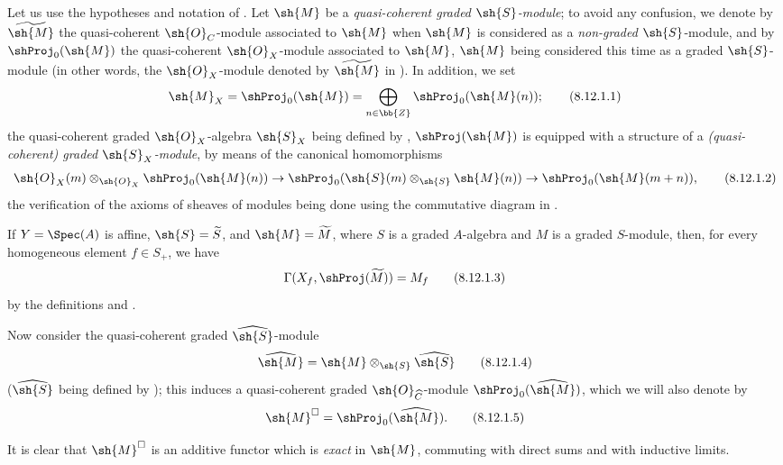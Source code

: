 \begin{env}[8.12.1]
\label{II.8.12.1}
Let us use the hypotheses and notation of .
Let $\sh{M}$ be a \emph{quasi-coherent graded $\sh{S}$-module}; to avoid any confusion, we denote by $\widetilde{\sh{M}}$ the quasi-coherent $\sh{O}_C$-module
associated to $\sh{M}$  when $\sh{M}$ is considered as a \emph{non-graded} $\sh{S}$-module, and by $\shProj_0(\sh{M})$ the quasi-coherent $\sh{O}_X$-module associated to $\sh{M}$, $\sh{M}$ being considered this time as a graded $\sh{S}$-module (in other words, the $\sh{O}_X$-module denoted by $\widetilde{\sh{M}}$ in ).
In addition, we set
\[
\label{II.8.12.1.1}
  \sh{M}_X=\shProj_0(\sh{M})=\bigoplus_{n\in\bb{Z}}\shProj_0(\sh{M}(n));
\tag{8.12.1.1}
\]
the quasi-coherent graded $\sh{O}_X$-algebra $\sh{S}_X$ being defined by , $\shProj(\sh{M})$ is equipped with a structure of a \emph{(quasi-coherent) graded $\sh{S}_X$-module}, by means of the canonical homomorphisms 
\[
\label{II.8.12.1.2}
  \sh{O}_X(m)\otimes_{\sh{O}_X}\shProj_0(\sh{M}(n))\to\shProj_0(\sh{S}(m)\otimes_\sh{S}\sh{M}(n))\to\shProj_0(\sh{M}(m+n)),
\tag{8.12.1.2}
\]
the verification of the axioms of sheaves of modules being done using the commutative diagram in .

If $Y=\Spec(A)$ is affine, $\sh{S}=\widetilde{S}$, and $\sh{M}=\widetilde{M}$, where $S$ is a graded $A$-algebra and $M$ is a graded $S$-module, then, for every homogeneous element $f\in S_+$, we have
\[
\label{II.8.12.1.3}
  \Gamma(X_f,\shProj(\widetilde{M}))=M_f
\tag{8.12.1.3}
\]
by the definitions and .

Now consider the quasi-coherent graded $\widehat{\sh{S}}$-module
\[
\label{II.8.12.1.4}
  \widehat{\sh{M}}=\sh{M}\otimes_\sh{S}\widehat{\sh{S}}
\tag{8.12.1.4}
\]
($\widehat{\sh{S}}$ being defined by ); this induces a quasi-coherent graded $\sh{O}_{\widehat{C}}$-module $\shProj_0(\widehat{\sh{M}})$, which we will also denote by
\[
\label{II.8.12.1.5}
  \sh{M}^\square=\shProj_0(\widehat{\sh{M}}).
\tag{8.12.1.5}
\]

It is clear  that $\sh{M}^\square$ is an additive functor which is \emph{exact} in $\sh{M}$, commuting with direct sums and with inductive limits.
\end{env}

